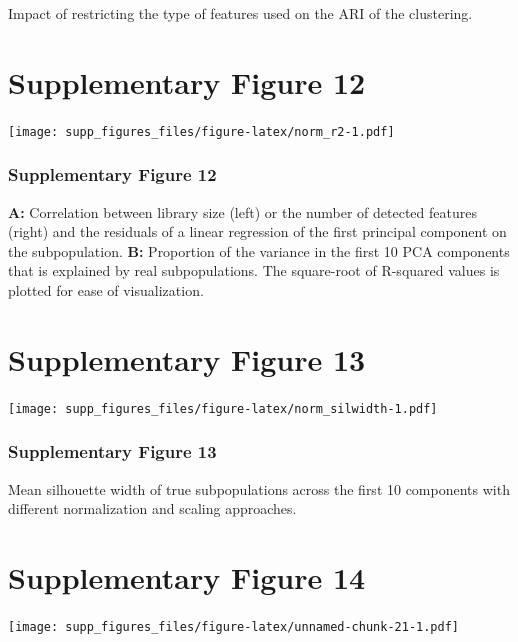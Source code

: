 \documentclass[]{article}
\begin{document}
Impact of restricting the type of features used on the ARI of the
clustering. \newpage

\hypertarget{supplementary-figure-12}{%
\section{Supplementary Figure 12}\label{supplementary-figure-12}}

\texttt{[image: supp\_figures\_files/figure-latex/norm\_r2-1.pdf]}

\hypertarget{supplementary-figure-12-1}{%
\subsubsection{Supplementary Figure
12}\label{supplementary-figure-12-1}}

\textbf{A:} Correlation between library size (left) or the number of
detected features (right) and the residuals of a linear regression of
the first principal component on the subpopulation. \textbf{B:}
Proportion of the variance in the first 10 PCA components that is
explained by real subpopulations. The square-root of R-squared values is
plotted for ease of visualization.

\newpage

\hypertarget{supplementary-figure-13}{%
\section{Supplementary Figure 13}\label{supplementary-figure-13}}

\texttt{[image: supp\_figures\_files/figure-latex/norm\_silwidth-1.pdf]}

\hypertarget{supplementary-figure-13-1}{%
\subsubsection{Supplementary Figure
13}\label{supplementary-figure-13-1}}

Mean silhouette width of true subpopulations across the first 10
components with different normalization and scaling approaches.

\newpage

\hypertarget{supplementary-figure-14}{%
\section{Supplementary Figure 14}\label{supplementary-figure-14}}

\texttt{[image: supp\_figures\_files/figure-latex/unnamed-chunk-21-1.pdf]}
\end{document}
